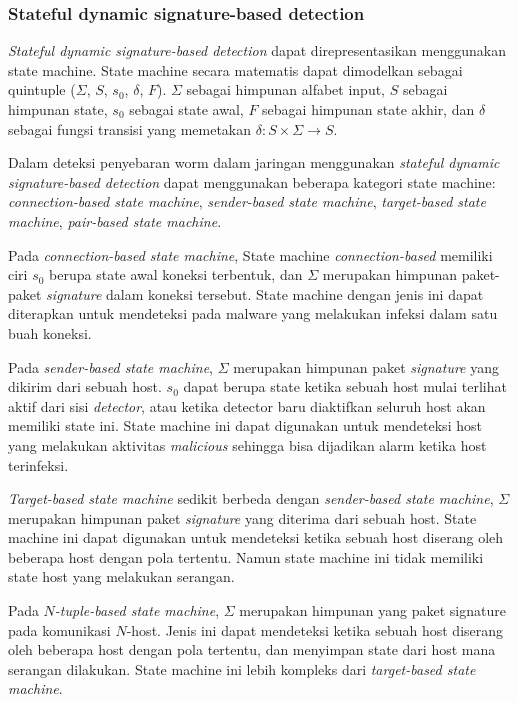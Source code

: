 \subsubsection{Stateful dynamic signature-based detection}

\textit{Stateful dynamic signature-based detection} dapat direpresentasikan menggunakan state machine. State machine secara matematis dapat dimodelkan sebagai quintuple ($\Sigma$, $S$, $s_0$, $\delta$, $F$). $\Sigma$ sebagai himpunan alfabet input, $S$ sebagai himpunan state, $s_0$ sebagai state awal, $F$ sebagai himpunan state akhir, dan $\delta$ sebagai fungsi transisi yang memetakan $\delta : S \times \Sigma \rightarrow S$. 

Dalam deteksi penyebaran worm dalam jaringan menggunakan \textit{stateful dynamic signature-based detection} dapat menggunakan beberapa kategori state machine: \textit{connection-based state machine}, \textit{sender-based state machine}, \textit{target-based state machine}, \textit{pair-based state machine}.

Pada \textit{connection-based state machine}, State machine \textit{connection-based} memiliki ciri $s_0$ berupa state awal koneksi terbentuk, dan $\Sigma$ merupakan himpunan paket-paket \textit{signature} dalam koneksi tersebut. State machine dengan jenis ini dapat diterapkan untuk mendeteksi pada malware yang melakukan infeksi dalam satu buah koneksi.

Pada \textit{sender-based state machine}, $\Sigma$ merupakan himpunan paket \textit{signature} yang dikirim dari sebuah host. $s_0$ dapat berupa state ketika sebuah host mulai terlihat aktif dari sisi \textit{detector}, atau ketika detector baru diaktifkan seluruh host akan memiliki state ini. State machine ini dapat digunakan untuk mendeteksi host yang melakukan aktivitas \textit{malicious} sehingga bisa dijadikan alarm ketika host terinfeksi.

\textit{Target-based state machine} sedikit berbeda dengan \textit{sender-based state machine}, $\Sigma$ merupakan himpunan paket \textit{signature} yang diterima dari sebuah host. State machine ini dapat digunakan untuk mendeteksi ketika sebuah host diserang oleh beberapa host dengan pola tertentu. Namun state machine ini tidak memiliki state host yang melakukan serangan.

Pada \textit{$N$-tuple-based state machine}, $\Sigma$ merupakan himpunan yang paket signature pada komunikasi $N$-host. Jenis ini dapat mendeteksi ketika sebuah host diserang oleh beberapa host dengan pola tertentu, dan menyimpan state dari host mana serangan dilakukan. State machine ini lebih kompleks dari \textit{target-based state machine}.

